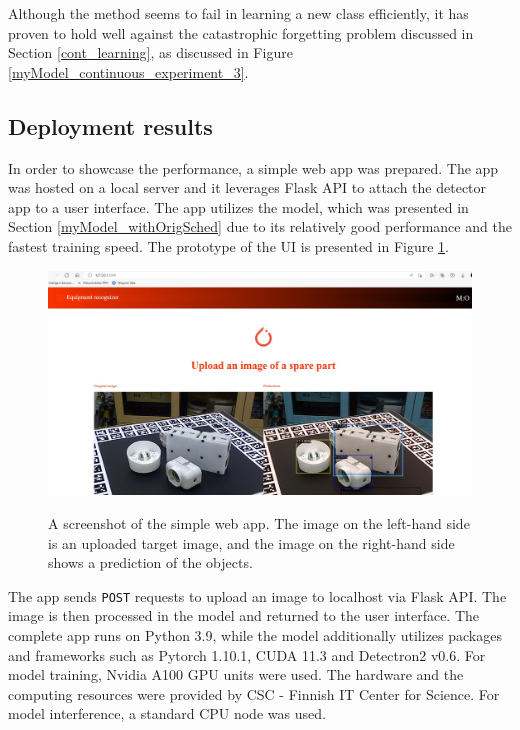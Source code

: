 \documentclass[english, 12pt, a4paper, elec, utf8, a-1b, online]{aaltothesis}
\begin{document}
Although the method seems to fail in learning a new class efficiently, it has proven to hold well against the catastrophic forgetting problem discussed in Section \ref{cont_learning}, as discussed in Figure \ref{myModel_continuous_experiment_3}. 

\subsection{Deployment results}
In order to showcase the performance, a simple web app was prepared. The app was hosted on a local server and it leverages Flask API to attach the detector app to a user interface. The app utilizes the model, which was presented in Section \ref{myModel_withOrigSched} due to its relatively good performance and the fastest training speed. The prototype of the UI is presented in Figure \ref{demo}. 

\begin{figure}[htb]
	\begin{center}
		\includegraphics[width=14cm]{./demo.png}
	\end{center}
	\caption{A screenshot of the simple web app. The image on the left-hand side is an uploaded target image, and the image on the right-hand side shows a prediction of the objects.}
	\begin{center}
		\label{demo}
	\end{center}
\end{figure}

The app sends \texttt{POST} requests to upload an image to localhost via Flask API. The image is then processed in the model and returned to the user interface. The complete app runs on Python 3.9, while the model additionally utilizes packages and frameworks such as Pytorch 1.10.1, CUDA 11.3 and Detectron2 v0.6. For model training, Nvidia A100 GPU units were used. The hardware and the computing resources were provided by CSC - Finnish IT Center for Science. For model interference, a standard CPU node was used. 
\end{document}
